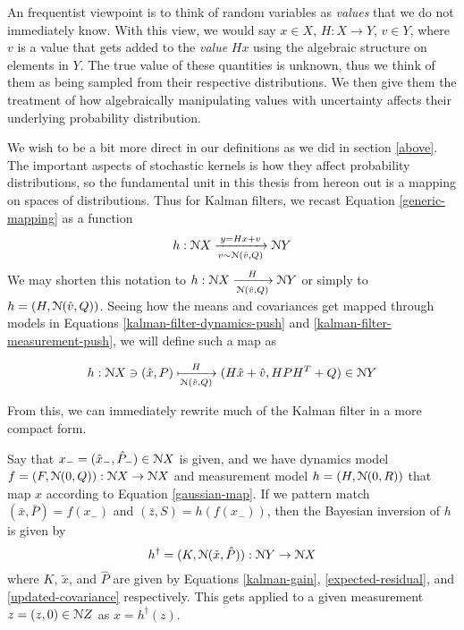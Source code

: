 An frequentist viewpoint is to think of random variables as \emph{values} that we do not immediately know. With this view, we would say $x\in X$, $H:X\rightarrow Y$, $v\in Y$, where $v$ is a value that gets added to the \emph{value} $Hx$ using the algebraic structure on elements in $Y$. The true value of these quantities is unknown, thus we think of them as being sampled from their respective distributions. We then give them the treatment of how algebraically manipulating values with uncertainty affects their underlying probability distribution.

We wish to be a bit more direct in our definitions as we did in section \ref{above}. The important aspects of stochastic kernels is how they affect probability distributions, so the fundamental unit in this thesis from hereon out is a mapping on spaces of distributions. Thus for Kalman filters, we recast Equation \ref{generic-mapping} as a function
\begin{equation}
	h:\mathcal{N} X\xrightarrow[v\sim\mathcal{N}(\hat{v},Q)]{y = Hx + v} \mathcal{N} Y
\end{equation}
We may shorten this notation to $h:\mathcal{N} X \xrightarrow[\mathcal{N}(\hat{v},Q)]{H} \mathcal{N} Y$ or simply to $h = (H, \mathcal{N}(\hat{v},Q))$.
Seeing how the means and covariances get mapped through models in Equations \ref{kalman-filter-dynamics-push} and \ref{kalman-filter-measurement-push}, we will define such a map as

\begin{equation}
	\label{gaussian-map}
	h:\mathcal{N} X\ni (\hat{x},P) \xmapsto[\mathcal{N}(\hat{v}, Q)]{H} (H\hat{x} + \hat{v}, HPH^T + Q) \in \mathcal{N} Y
\end{equation}

From this, we can immediately rewrite much of the Kalman filter in a more compact form. 

Say that $x_- = (\hat{x}_-, \hat{P}_-)\in \mathcal{N} X$ is given, and we have dynamics model $f = (F,\mathcal{N}(0,Q)):\mathcal{N} X \rightarrow \mathcal{N} X$ and measurement model $h = (H,\mathcal{N}(0,R))$ that map $x$ according to Equation \ref{gaussian-map}. If we pattern match $(\bar{x}, \bar{P}) = f(x_-)$ and $(\bar{z}, S) = h(f(x_-))$, then the Bayesian inversion of $h$ is given by
\begin{equation}
    \label{kalman-dagger}
    h^\dagger = (K, \mathcal{N}(\tilde{x}, \hat{P})) : \mathcal{N} Y\rightarrow \mathcal{N} X
\end{equation}
where $K$, $\tilde{x}$, and $\hat{P}$ are given by Equations \ref{kalman-gain}, \ref{expected-residual}, and \ref{updated-covariance} respectively. This gets applied to a given measurement $z = (z,0)\in \mathcal{N}{Z}$ as $x = h^\dagger(z)$.

